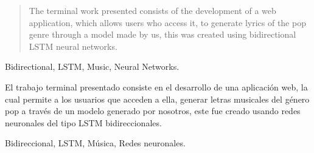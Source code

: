 \begin{abstract}
   The terminal work presented consists of the development of a web application, which allows users who access it, to generate lyrics of the pop genre through a model made by us, this was created using bidirectional LSTM neural networks. 
  \end{abstract}

\begin{IEEEkeywords}
	Bidirectional, LSTM, Music, Neural Networks.
\end{IEEEkeywords}

  \begin{resumen}
    El trabajo terminal presentado consiste en el desarrollo de una aplicación web, la cual permite a los usuarios que acceden a ella, generar letras musicales del género pop a través de un modelo generado por nosotros, este fue creado usando redes neuronales del tipo LSTM bidireccionales.
  \end{resumen}
  
  \begin{palabrasclave}    
    Bidireccional, LSTM, Música, Redes neuronales.
  \end{palabrasclave}